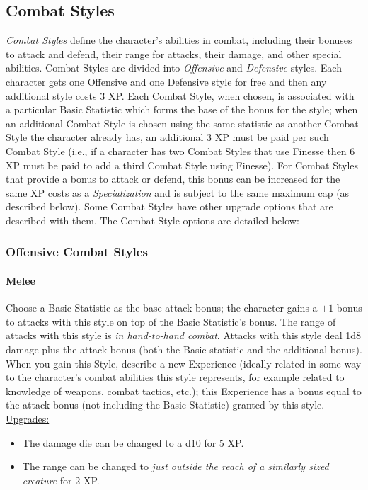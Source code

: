 \subsection{Combat Styles}\label{sec:combat-styles}
\emph{Combat Styles} define the character's abilities in combat, including their bonuses to attack and defend, their range for attacks, their damage, and other special abilities.
Combat Styles are divided into \emph{Offensive} and \emph{Defensive} styles.
Each character gets one Offensive and one Defensive style for free and then any additional style costs 3 XP.
Each Combat Style, when chosen, is associated with a particular Basic Statistic which forms the base of the bonus for the style; when an additional Combat Style is chosen using the same statistic as another Combat Style the character already has, an additional 3 XP must be paid per such Combat Style (i.e., if a character has two Combat Styles that use Finesse then 6 XP must be paid to add a third Combat Style using Finesse).
For Combat Styles that provide a bonus to attack or defend, this bonus can be increased for the same XP costs as a \emph{Specialization} and is subject to the same maximum cap (as described below).
Some Combat Styles have other upgrade options that are described with them.
The Combat Style options are detailed below:

\subsubsection{Offensive Combat Styles}
\paragraph{Melee}
Choose a Basic Statistic as the base attack bonus; the character gains a $+1$ bonus to attacks with this style on top of the Basic Statistic's bonus.
The range of attacks with this style is \emph{in hand-to-hand combat}.
Attacks with this style deal 1d8 damage plus the attack bonus (both the Basic statistic and the additional bonus).
When you gain this Style, describe a new Experience (ideally related in some way to the character's combat abilities this style represents, for example related to knowledge of weapons, combat tactics, etc.); this Experience has a bonus equal to the attack bonus (not including the Basic Statistic) granted by this style.
\\
\underline{Upgrades:}
\begin{itemize}
  \item[-] The damage die can be changed to a d10 for 5 XP.
  \item[-] The range can be changed to \emph{just outside the reach of a similarly sized creature} for 2 XP.
\end{itemize}

